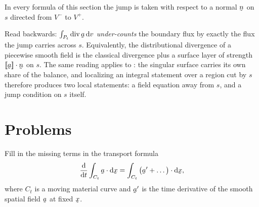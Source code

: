 In every formula of this section the jump is taken with respect to a
normal $\bn$ on $s$ directed from $V^{-}$ to $V^{+}$.

\begin{remark}\label{rem:distrib}
Read  backwards: $\int_{P_{t}}\dvg\ba\,\dl v$ \emph{under-counts}
the boundary flux by exactly the flux the jump carries across $s$.
Equivalently, the distributional divergence of a piecewise smooth field
is the classical divergence plus a surface layer of strength
$\ip{\jump\ba}\bn$ on $s$. The same reading applies to : the
singular surface carries its own share of the balance, and localizing an
integral statement over a region cut by $s$ therefore produces two local statements: a field equation away from $s$,
and a jump condition on $s$ itself.
\end{remark}

\setcounter{problemenv}{0}
\section{Problems}\label{sec:problems:c5}

\begin{problem}
Fill in the missing terms in the transport formula
\[
   \frac{\dl}{\dl t}\int_{C_{t}}\ip\ba{\dl\bx}
   =\int_{C_{t}}\ip{\big(\ba'+\dots\big)}{\dl\bx},
\]
where $C_{t}$ is a moving material curve and $\ba'$ is the time derivative
of the smooth spatial field $\ba$ at fixed $\bx$.
\end{problem}

